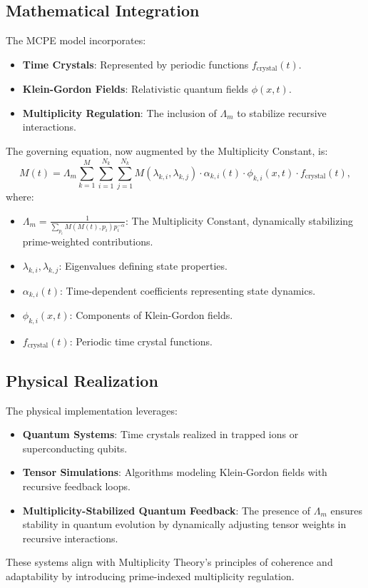\documentclass{article}
\theoremstyle{plain}
\begin{document}
\subsection{Mathematical Integration}
The MCPE model incorporates:
\begin{itemize}
    \item \textbf{Time Crystals}: Represented by periodic functions \( f_{\text{crystal}}(t) \).
    \item \textbf{Klein-Gordon Fields}: Relativistic quantum fields \( \phi(x, t) \).
    \item \textbf{Multiplicity Regulation}: The inclusion of \( \Lambda_m \) to stabilize recursive interactions.
\end{itemize}
The governing equation, now augmented by the Multiplicity Constant, is:
\begin{equation}
M(t) = \Lambda_m \sum_{k=1}^M \sum_{i=1}^{N_k} \sum_{j=1}^{N_k} M(\lambda_{k,i}, \lambda_{k,j}) \cdot \alpha_{k,i}(t) \cdot \phi_{k,i}(x,t) \cdot f_{\text{crystal}}(t),
\end{equation}
where:
\begin{itemize}
    \item \( \Lambda_m = \frac{1}{\sum_{p_i} M(M(t), p_i) p_i^{-\alpha}} \): The Multiplicity Constant, dynamically stabilizing prime-weighted contributions.
    \item \( \lambda_{k,i}, \lambda_{k,j} \): Eigenvalues defining state properties.
    \item \( \alpha_{k,i}(t) \): Time-dependent coefficients representing state dynamics.
    \item \( \phi_{k,i}(x,t) \): Components of Klein-Gordon fields.
    \item \( f_{\text{crystal}}(t) \): Periodic time crystal functions.
\end{itemize}

\subsection{Physical Realization}
The physical implementation leverages:
\begin{itemize}
    \item \textbf{Quantum Systems}: Time crystals realized in trapped ions or superconducting qubits.
    \item \textbf{Tensor Simulations}: Algorithms modeling Klein-Gordon fields with recursive feedback loops.
    \item \textbf{Multiplicity-Stabilized Quantum Feedback}: The presence of \( \Lambda_m \) ensures stability in quantum evolution by dynamically adjusting tensor weights in recursive interactions.
\end{itemize}
These systems align with Multiplicity Theory’s principles of coherence and adaptability by introducing prime-indexed multiplicity regulation.
\end{document}
